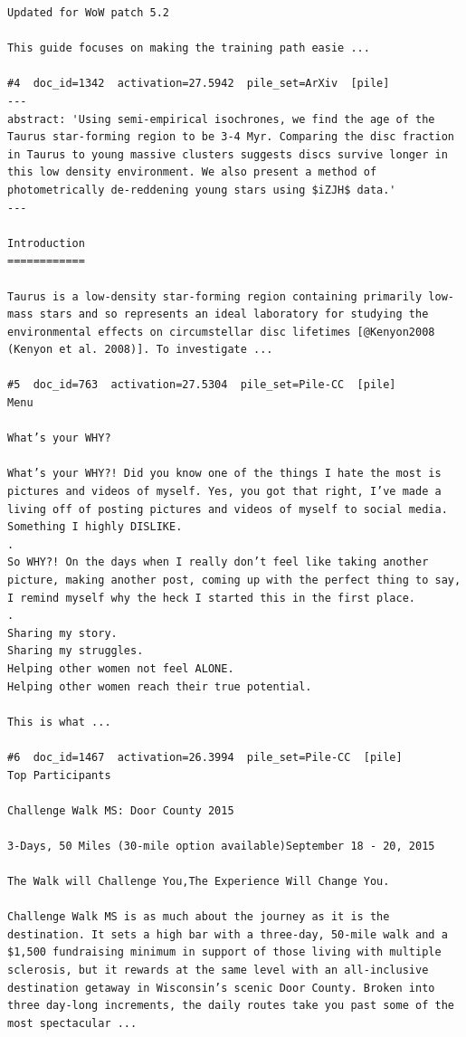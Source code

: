\begin{verbatim}
Updated for WoW patch 5.2

This guide focuses on making the training path easie ...

#4  doc_id=1342  activation=27.5942  pile_set=ArXiv  [pile]
---
abstract: 'Using semi-empirical isochrones, we find the age of the Taurus star-forming region to be 3-4 Myr. Comparing the disc fraction in Taurus to young massive clusters suggests discs survive longer in this low density environment. We also present a method of photometrically de-reddening young stars using $iZJH$ data.'
---

Introduction
============

Taurus is a low-density star-forming region containing primarily low-mass stars and so represents an ideal laboratory for studying the environmental effects on circumstellar disc lifetimes [@Kenyon2008 (Kenyon et al. 2008)]. To investigate ...

#5  doc_id=763  activation=27.5304  pile_set=Pile-CC  [pile]
Menu

What’s your WHY?

What’s your WHY?! Did you know one of the things I hate the most is pictures and videos of myself. Yes, you got that right, I’ve made a living off of posting pictures and videos of myself to social media. Something I highly DISLIKE.
.
So WHY?! On the days when I really don’t feel like taking another picture, making another post, coming up with the perfect thing to say, I remind myself why the heck I started this in the first place.
.
Sharing my story.
Sharing my struggles.
Helping other women not feel ALONE.
Helping other women reach their true potential.

This is what ...

#6  doc_id=1467  activation=26.3994  pile_set=Pile-CC  [pile]
Top Participants

Challenge Walk MS: Door County 2015

3-Days, 50 Miles (30-mile option available)September 18 - 20, 2015

The Walk will Challenge You,The Experience Will Change You.

Challenge Walk MS is as much about the journey as it is the destination. It sets a high bar with a three-day, 50-mile walk and a $1,500 fundraising minimum in support of those living with multiple sclerosis, but it rewards at the same level with an all-inclusive destination getaway in Wisconsin’s scenic Door County. Broken into three day-long increments, the daily routes take you past some of the most spectacular ...


\end{verbatim}
